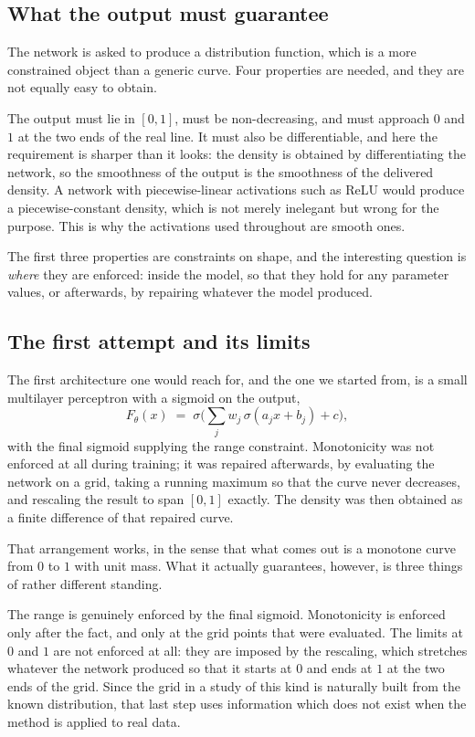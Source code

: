 \documentclass[11pt]{article}
\begin{document}
\subsection{What the output must guarantee}

The network is asked to produce a distribution function, which is a more constrained object
than a generic curve. Four properties are needed, and they are not equally easy to obtain.

The output must lie in $[0,1]$, must be non-decreasing, and must approach $0$ and $1$ at the
two ends of the real line. It must also be differentiable, and here the requirement is
sharper than it looks: the density is obtained by differentiating the network, so the
smoothness of the output is the smoothness of the delivered density. A network with
piecewise-linear activations such as ReLU would produce a piecewise-constant density, which
is not merely inelegant but wrong for the purpose. This is why the activations used
throughout are smooth ones.

The first three properties are constraints on shape, and the interesting question is
\emph{where} they are enforced: inside the model, so that they hold for any parameter values,
or afterwards, by repairing whatever the model produced.

\subsection{The first attempt and its limits}

The first architecture one would reach for, and the one we started from, is a small
multilayer perceptron with a sigmoid on the output,
\begin{equation}
F_\theta(x) \;=\; \sigma\!\Big( \textstyle\sum_{j} w_j\, \sigma(a_j x + b_j) + c \Big),
\label{eq:mlp}
\end{equation}
with the final sigmoid supplying the range constraint. Monotonicity was not enforced at all
during training; it was repaired afterwards, by evaluating the network on a grid, taking a
running maximum so that the curve never decreases, and rescaling the result to span $[0,1]$
exactly. The density was then obtained as a finite difference of that repaired curve.

That arrangement works, in the sense that what comes out is a monotone curve from $0$ to $1$
with unit mass. What it actually guarantees, however, is three things of rather different
standing.

The range is genuinely enforced by the final sigmoid. Monotonicity is enforced only after the
fact, and only at the grid points that were evaluated. The limits at $0$ and $1$ are not
enforced at all: they are imposed by the rescaling, which stretches whatever the network
produced so that it starts at $0$ and ends at $1$ at the two ends of the grid. Since the grid
in a study of this kind is naturally built from the known distribution, that last step uses
information which does not exist when the method is applied to real data.
\end{document}
